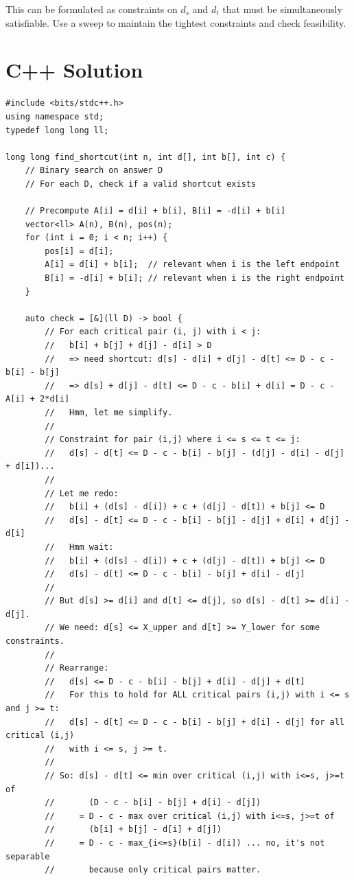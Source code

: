 \documentclass[11pt,a4paper]{article}
\begin{document}
This can be formulated as constraints on $d_s$ and $d_t$ that must be simultaneously satisfiable. Use a sweep to maintain the tightest constraints and check feasibility.

\section{C++ Solution}

\begin{lstlisting}
#include <bits/stdc++.h>
using namespace std;
typedef long long ll;

long long find_shortcut(int n, int d[], int b[], int c) {
    // Binary search on answer D
    // For each D, check if a valid shortcut exists

    // Precompute A[i] = d[i] + b[i], B[i] = -d[i] + b[i]
    vector<ll> A(n), B(n), pos(n);
    for (int i = 0; i < n; i++) {
        pos[i] = d[i];
        A[i] = d[i] + b[i];  // relevant when i is the left endpoint
        B[i] = -d[i] + b[i]; // relevant when i is the right endpoint
    }

    auto check = [&](ll D) -> bool {
        // For each critical pair (i, j) with i < j:
        //   b[i] + b[j] + d[j] - d[i] > D
        //   => need shortcut: d[s] - d[i] + d[j] - d[t] <= D - c - b[i] - b[j]
        //   => d[s] + d[j] - d[t] <= D - c - b[i] + d[i] = D - c - A[i] + 2*d[i]
        //   Hmm, let me simplify.
        //
        // Constraint for pair (i,j) where i <= s <= t <= j:
        //   d[s] - d[t] <= D - c - b[i] - b[j] - (d[j] - d[i] - d[j] + d[i])...
        //
        // Let me redo:
        //   b[i] + (d[s] - d[i]) + c + (d[j] - d[t]) + b[j] <= D
        //   d[s] - d[t] <= D - c - b[i] - b[j] - d[j] + d[i] + d[j] - d[i]
        //   Hmm wait:
        //   b[i] + (d[s] - d[i]) + c + (d[j] - d[t]) + b[j] <= D
        //   d[s] - d[t] <= D - c - b[i] - b[j] + d[i] - d[j]
        //
        // But d[s] >= d[i] and d[t] <= d[j], so d[s] - d[t] >= d[i] - d[j].
        // We need: d[s] <= X_upper and d[t] >= Y_lower for some constraints.
        //
        // Rearrange:
        //   d[s] <= D - c - b[i] - b[j] + d[i] - d[j] + d[t]
        //   For this to hold for ALL critical pairs (i,j) with i <= s and j >= t:
        //   d[s] - d[t] <= D - c - b[i] - b[j] + d[i] - d[j] for all critical (i,j)
        //   with i <= s, j >= t.
        //
        // So: d[s] - d[t] <= min over critical (i,j) with i<=s, j>=t of
        //       (D - c - b[i] - b[j] + d[i] - d[j])
        //     = D - c - max over critical (i,j) with i<=s, j>=t of
        //       (b[i] + b[j] - d[i] + d[j])
        //     = D - c - max_{i<=s}(b[i] - d[i]) ... no, it's not separable
        //       because only critical pairs matter.


\end{lstlisting}
\end{document}

